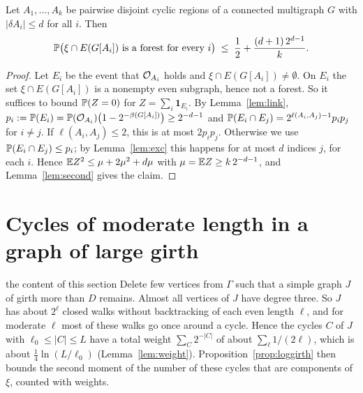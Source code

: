 \documentclass[11pt]{article}
\begin{document}
\begin{lemma}\label{lem:smallcuts}
Let $A_1,\dots,A_k$ be pairwise disjoint cyclic regions of a connected multigraph $G$ with
$|\delta A_i|\le d$ for all $i$. Then
\[
  \mathbb{P}\bigl(\xi\cap E(G[A_i])\text{ is a forest for every }i\bigr)\;\le\;\frac12+\frac{(d+1)\,2^{d-1}}{k}.
\]
\end{lemma}

\begin{proof}
Let $E_i$ be the event that $\mathcal{O}_{A_i}$ holds and $\xi\cap E(G[A_i])\ne\emptyset$. On $E_i$ the set
$\xi\cap E(G[A_i])$ is a nonempty even subgraph, hence not a forest. So it suffices to bound
$\mathbb{P}(Z=0)$ for $Z=\sum_i\mathbf{1}_{E_i}$. By Lemma~\ref{lem:link},
$p_i:=\mathbb{P}(E_i)=\mathbb{P}(\mathcal{O}_{A_i})\bigl(1-2^{-\beta(G[A_i])}\bigr)\ge2^{-d-1}$ and
$\mathbb{P}(E_i\cap E_j)=2^{\ell(A_i,A_j)-1}p_ip_j$ for $i\ne j$. If $\ell(A_i,A_j)\le2$, this is at most
$2p_ip_j$. Otherwise we use $\mathbb{P}(E_i\cap E_j)\le p_i$; by Lemma~\ref{lem:exc} this happens for at
most $d$ indices $j$, for each $i$. Hence $\mathbb{E} Z^{2}\le\mu+2\mu^{2}+d\mu$ with
$\mu=\mathbb{E} Z\ge k\,2^{-d-1}$, and Lemma~\ref{lem:second} gives the claim.
\end{proof}

\section{Cycles of moderate length in a graph of large girth}\label{sec:moderate}

\begin{idea}{the content of this section}
Delete few vertices from $\Gamma$ such that a simple graph $J$ of girth more than $D$ remains.
Almost all vertices of $J$ have degree three. So $J$ has about $2^{\ell}$ closed walks without
backtracking of each even length $\ell$, and for moderate $\ell$ most of these walks go once
around a cycle. Hence the cycles $C$ of $J$ with $\ell_0\le|C|\le L$ have a total weight
$\sum_C2^{-|C|}$ of about $\sum_\ell1/(2\ell)$, which is about $\frac14\ln(L/\ell_0)$
(Lemma~\ref{lem:weight}). Proposition~\ref{prop:loggirth} then bounds the second moment of the
number of these cycles that are components of $\xi$, counted with weights.
\end{idea}
\end{document}
